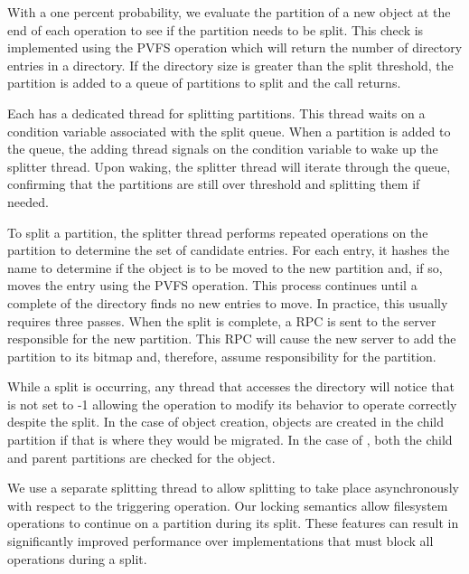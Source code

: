 \documentclass[onecolumn, 11pt, letterpaper]{article}
\begin{document}
With a one percent probability, we evaluate the partition of a new object at
the end of each  operation to see if the partition needs to be
split.  This check is implemented using the PVFS  operation
which will return the number of directory entries in a directory.  If the
directory size is greater than the split threshold, the partition is added to
a queue of partitions to split and the  call returns.

Each  has a dedicated thread for splitting partitions.
This thread waits on a condition variable associated with the split queue.
When a partition is added to the queue, the adding thread signals on the
condition variable to wake up the splitter thread.  Upon waking, the splitter
thread will iterate through the queue, confirming that the partitions are
still over threshold and splitting them if needed.

To split a partition, the splitter thread performs repeated 
operations on the partition to determine the set of candidate entries.  For
each entry, it hashes the name to determine if the object is to be moved to
the new partition and, if so, moves the entry using the PVFS 
operation.  This process continues until a complete  of the
directory finds no new entries to move.  In practice, this usually requires
three passes.  When the split is complete, a  RPC is
sent to the server responsible for the new partition.  This RPC will cause the
new server to add the partition to its bitmap and, therefore, assume responsibility for
the partition.

While a split is occurring, any thread that accesses the directory will notice
that  is not set to -1 allowing the operation to
modify its behavior to operate correctly despite the split.  In the case of
object creation, objects are created in the child partition if that is where
they would be migrated.  In the case of , both the child and
parent partitions are checked for the object.

We use a separate splitting thread to allow splitting to take place
asynchronously with respect to the triggering  operation.
Our locking semantics allow filesystem operations to continue on a partition
during its split.  These features can result in significantly improved
performance over implementations that must block all operations during a split.
\end{document}

